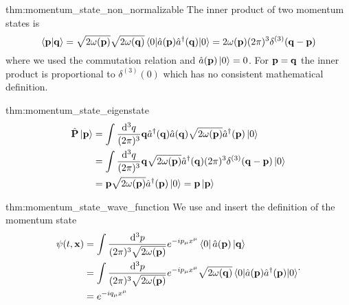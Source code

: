 \begin{delayedproof}{thm:momentum_state_non_normalizable}
	The inner product of two momentum states is
	\begin{equation*}
		\braket{\vb{p}}{\vb{q}}
		=
		\sqrt{2\omega(\vb{p})}
		\sqrt{2\omega(\vb{q})}
		\expval{\hat{a}(\vb{p})\hat{a}^\dagger(\vb{q})}{0}
		=
		2\omega(\vb{p})
		(2\pi)^3
		\delta^{(3)}(\vb{q}-\vb{p})
	\end{equation*}
	where we used the commutation relation and $\hat{a}(\vb{p})\ket{0}=0$.
	For $\vb{p}=\vb{q}$ the inner product is proportional to $\delta^{(3)}(0)$ which has no consistent mathematical definition.
\end{delayedproof}
\begin{delayedproof}{thm:momentum_state_eigenstate}
	\begin{equation*}
		\begin{split}
			\hat{\vb{P}}
			\ket{\vb{p}}
			&=
			\int\frac{\dd[3]{q}}{(2\pi)^3}
			\vb{q}
			\hat{a}^\dagger(\vb{q})
			\hat{a}(\vb{q})
			\sqrt{2\omega(\vb{p})}
			\hat{a}^\dagger(\vb{p})
			\ket{0}
			\\
			&=
			\int\frac{\dd[3]{q}}{(2\pi)^3}
			\vb{q}
			\sqrt{2\omega(\vb{p})}
			\hat{a}^\dagger(\vb{q})
			(2\pi)^3
			\delta^{(3)}(\vb{q}-\vb{p})
			\ket{0}
			\\
			&=
			\vb{p}
			\sqrt{2\omega(\vb{p})}
			\hat{a}^\dagger(\vb{p})
			\ket{0}
			=
			\vb{p}
			\ket{\vb{p}}
		\end{split}
	\end{equation*}
\end{delayedproof}
\begin{delayedproof}{thm:momentum_state_wave_function}
	We use  and insert the definition of the momentum state
	\begin{equation*}
		\begin{split}
			\psi(t,\vb{x})
			&=
			\int\frac{\dd[3]{p}}{(2\pi)^3\sqrt{2\omega(\vb{p})}}
			e^{-ip_\mu x^\mu}
			\bra{0}
			\hat{a}(\vb{p})
			\ket{\vb{q}}
			\\
			&=
			\int\frac{\dd[3]{p}}{(2\pi)^3\sqrt{2\omega(\vb{p})}}
			e^{-ip_\mu x^\mu}
			\sqrt{2\omega(\vb{q})}
			\expval{
				\hat{a}(\vb{p})
				\hat{a}^\dagger(\vb{p})
			}{0}
			\\
			&=
			e^{-iq_\mu x^\mu}
		\end{split}
		.
	\end{equation*}
\end{delayedproof}

